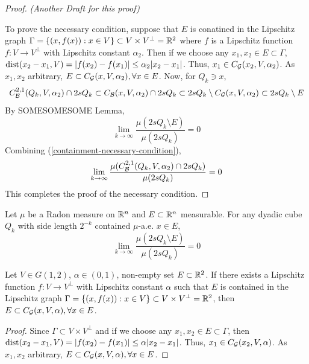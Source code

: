 \begin{proof}
{    \textit{(Another Draft for this proof)} 

    To prove the necessary condition, suppose that $E$ is conatined in the Lipschitz graph $\Gamma = \{(x, f(x)) : x\in V\}\subset V\times V^\perp = \mathbb{R}^2$ where $f$ is a Lipschitz function $f: V\rightarrow V^\perp$ with Lipschitz constant $\alpha_2$. Then if we choose any $x_1, x_2\in E\subset \Gamma$, $\operatorname{dist}(x_2-x_1, V) = |f(x_2)-f(x_1)| \leq \alpha_2 |x_2-x_1|$. Thus, $x_1\in C_\mathcal G(x_2, V, \alpha_2)$. As $x_1, x_2$ arbitrary, $E\subset C_\mathcal G(x, V, \alpha_2), \forall x\in E$. Now, for $Q_k\ni x$,
    \begin{equation}
        C_\mathcal B^{2,1}(Q_k, V, \alpha_2)\cap 2sQ_k \subset C_\mathcal B(x,V, \alpha_2) \cap 2sQ_k \subset 2sQ_k \setminus C_\mathcal G(x, V, \alpha_2) \subset 2sQ_k \setminus E   
    \end{equation}
    By SOMESOMESOME Lemma,
    \begin{equation*}
        \lim_{k\rightarrow \infty}\frac{\mu(2sQ_k \setminus E)}{\mu(2sQ_k)} =0
    \end{equation*}
    Combining (\ref{containment-necessary-condition}),
    \begin{equation*}
        \lim_{k\rightarrow \infty}\frac{\mu(C_\mathcal B^{2,1}(Q_k, V, \alpha_2)\cap 2sQ_k)}{\mu(2sQ_k)} =0
    \end{equation*}
    This completes the proof of the necessary condition. 
    }
\end{proof}

{\color{red}
\begin{lemma} Let $\mu$ be a Radon measure on $\mathbb{R}^n$ and $E\subset \mathbb{R}^n$ measurable. For any dyadic cube $Q_k$ with side length $2^{-k}$ contained $\mu$-a.e. $x\in E$,
    \begin{equation*}
        \lim_{k\rightarrow \infty}\frac{\mu(2sQ_k \setminus E)}{\mu(2sQ_k)} =0
    \end{equation*}
\end{lemma}







\begin{lemma} Let $V\in G(1,2)$, $\alpha\in(0,1)$, non-empty set $E\subset \mathbb{R}^2$. If there exists a Lipschitz function $f: V\rightarrow V^\perp$ with Lipschitz constant $\alpha$ such that $E$ is contained in the Lipschitz graph $\Gamma = \{(x, f(x)) : x\in V\}\subset V\times V^\perp = \mathbb{R}^2$, then $E\subset C_\mathcal G(x, V, \alpha), \forall x\in E$.
\end{lemma}
\begin{proof}
    Since $\Gamma\subset V\times V^\perp$ and if we choose any $x_1, x_2\in E\subset \Gamma$, then $\operatorname{dist}(x_2-x_1, V) = |f(x_2)-f(x_1)| \leq \alpha |x_2-x_1|$. Thus, $x_1\in C_\mathcal G(x_2, V, \alpha)$. As $x_1, x_2$ arbitrary, $E\subset C_\mathcal G(x, V, \alpha), \forall x\in E$. 
\end{proof}
}




